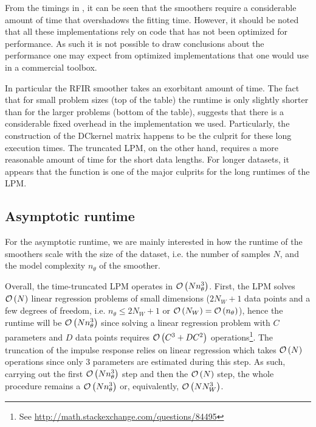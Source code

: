 From the timings in , it can be seen that the smoothers require a considerable amount of time that overshadows the fitting time.
However, it should be noted that all these implementations rely on code that has not been optimized for performance.
As such it is not possible to draw conclusions about the performance one may expect from optimized implementations that one would use in a commercial toolbox.

In particular the \gls{RFIR} smoother takes an exorbitant amount of time.
The fact that for small problem sizes (top of the table) the runtime is only slightly shorter than for the larger problems (bottom of the table), suggests that there is a considerable fixed overhead in the implementation we used.
Particularly, the construction of the \gls{DCkernel} matrix happens to be the culprit for these long execution times.
The truncated \gls{LPM}, on the other hand, requires a more reasonable amount of time for the short data lengths.
For longer datasets, it appears that the  function is one of the major culprits for the long runtimes of the \gls{LPM}.

\subsection{Asymptotic runtime}
For the asymptotic runtime, we are mainly interested in how the runtime of the smoothers scale with the size of the dataset, i.e. the number of samples $N$, and the model complexity $n_{\theta}$ of the smoother.


Overall, the time-truncated \gls{LPM} operates in $\mathcal{O} \left( N n_{\theta}^{3} \right)$.
First, the \gls{LPM} solves $\mathcal{O} \left( N \right)$ linear regression problems of small dimensions ($2N_W + 1$ data points and a few degrees of freedom, i.e. $n_{\theta} \leq 2 N_W + 1$ or $\mathcal{O} \left( N_W \right) = \mathcal{O} \left( n_{\theta} \right)$), hence the runtime will be $\mathcal{O} \left( N n_{\theta}^3 \right)$ since solving a linear regression problem with $C$ parameters and $D$ data points requires $\mathcal{O} \left( C^3  + D C^2 \right)$ operations\footnote{See \url{http://math.stackexchange.com/questions/84495}}.
The truncation of the impulse response relies on linear regression which takes $\mathcal{O} \left( N \right)$ operations since only $3$ parameters are estimated during this step.
As such, carrying out the first $\mathcal{O} \left( N n_{\theta}^3 \right)$ step and then the $\mathcal{O} \left( N \right)$ step, the whole procedure remains a $\mathcal{O} \left( N n_{\theta}^3 \right)$ or, equivalently, $\mathcal{O} \left( N N_W^3 \right)$.

